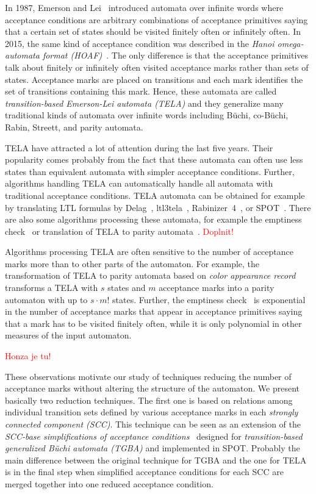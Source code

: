 \documentclass[a4paper,UKenglish,cleveref, autoref, thm-restate]{lipics-v2021}
\newcommand{\todo}[1]{\textcolor{red}{#1}}
\begin{document}
In 1987, Emerson and Lei~\cite{emerson.87.scp} introduced automata
over infinite words where acceptance conditions are arbitrary
combinations of acceptance primitives saying that a certain set of
states should be visited finitely often or infinitely often. In 2015,
the same kind of acceptance condition was described in the \emph{Hanoi
  omega-automata format (HOAF)}~\cite{babiak.15.cav}. The only
difference is that the acceptance primitives talk about finitely or
infinitely often visited acceptance marks rather than sets of states.
Acceptance marks are placed on transitions and each mark identifies
the set of transitions containing this mark. Hence, these automata are
called \emph{transition-based Emerson-Lei automata (TELA)} and they
generalize many traditional kinds of automata over infinite words
including Büchi, co-Büchi, Rabin, Streett, and parity automata.

TELA have attracted a lot of attention during the last five years.
Their popularity comes probably from the fact that these automata can
often use less states than equivalent automata with simpler acceptance
conditions. Further, algorithms handling TELA can automatically handle
all automata with traditional acceptance conditions. TELA automata can
be obtained for example by translating LTL formulas by
Delag~\cite{muller.17.gandalf}, ltl3tela~\cite{major.19.atva},
Rabinizer~4~\cite{kretinsky.18.cav}, or
SPOT~\cite{duret.16.atva2}. There are also some algorithms processing
these automata, for example the emptiness check~\cite{baier.19.atva}
or translation of TELA to parity automata~\cite{renkin.20.atva}. \todo{Doplnit!}

Algorithms processing TELA are often sensitive to the number of
acceptance marks more than to other parts of the automaton. For
example, the transformation of TELA to parity automata based on
\emph{color appearance record}~\cite{renkin.20.atva} transforms a TELA
with $s$ states and $m$ acceptance marks into a parity automaton with
up to $s\cdot m!$ states. Further, the emptiness
check~\cite{baier.19.atva} is exponential in the number of acceptance
marks that appear in acceptance primitives saying that a mark has to
be visited finitely often, while it is only polynomial in other
measures of the input automaton.

\todo{Honza je tu!}

These observations motivate our study of techniques reducing the
number of acceptance marks without altering the structure of the
automaton. We present basically two reduction techniques. The first
one is based on relations among individual transition sets defined by
various acceptance marks in each \emph{strongly connected component
  (SCC)}. This technique can be seen as an extension of the
\emph{SCC-base simplifications of acceptance
  conditions}~\cite{babiak.13.spin} designed for
\emph{transition-based generalized Büchi automata (TGBA)} and
implemented in SPOT. Probably the main difference between the original
technique for TGBA and the one for TELA is in the final step when
simplified acceptance conditions for each SCC are merged together into
one reduced acceptance condition.
\end{document}
